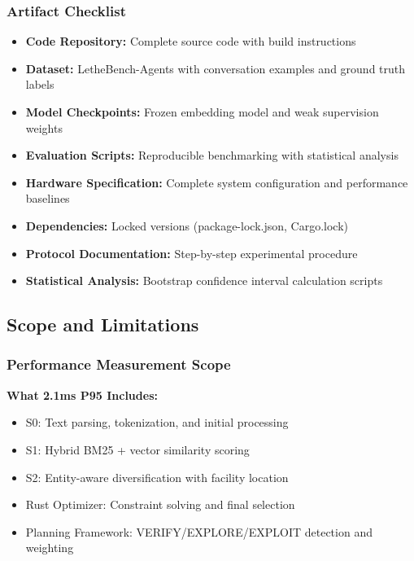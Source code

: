 \subsubsection{Artifact Checklist}
\begin{itemize}
    \item[$\square$] \textbf{Code Repository:} Complete source code with build instructions
    \item[$\square$] \textbf{Dataset:} LetheBench-Agents with conversation examples and ground truth labels  
    \item[$\square$] \textbf{Model Checkpoints:} Frozen embedding model and weak supervision weights
    \item[$\square$] \textbf{Evaluation Scripts:} Reproducible benchmarking with statistical analysis
    \item[$\square$] \textbf{Hardware Specification:} Complete system configuration and performance baselines
    \item[$\square$] \textbf{Dependencies:} Locked versions (package-lock.json, Cargo.lock)
    \item[$\square$] \textbf{Protocol Documentation:} Step-by-step experimental procedure
    \item[$\square$] \textbf{Statistical Analysis:} Bootstrap confidence interval calculation scripts
\end{itemize}

\subsection{Scope and Limitations}

\subsubsection{Performance Measurement Scope}
\textbf{What 2.1ms P95 Includes:}
\begin{itemize}
    \item S0: Text parsing, tokenization, and initial processing
    \item S1: Hybrid BM25 + vector similarity scoring  
    \item S2: Entity-aware diversification with facility location
    \item Rust Optimizer: Constraint solving and final selection
    \item Planning Framework: VERIFY/EXPLORE/EXPLOIT detection and weighting
\end{itemize}

